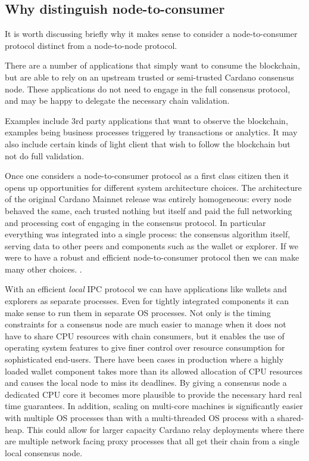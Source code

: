 \documentclass{article}
\newcommand{\njd}[1]{\textcolor{purple}{\emph{#1}}}
\theoremstyle{definition}{
  \newtheorem{lemma}{Lemma}[section] %
  \newtheorem{definition}[lemma]{Definition}
}
\theoremstyle{theorem}{
  \newtheorem{invariant}[lemma]{Invariant}
  \newtheorem{proofobligation}[lemma]{Proof Obligation}
}
\numberwithin{equation}{lemma}
\begin{document}
\subsection{Why distinguish node-to-consumer}

It is worth discussing briefly why it makes sense to consider a node-to-consumer
protocol distinct from a node-to-node protocol.

There are a number of applications that simply want to consume the blockchain,
but are able to rely on an upstream trusted or semi-trusted Cardano consensus
node. These applications do not need to engage in the full consensus protocol,
and may be happy to delegate the necessary chain validation.

Examples include 3rd party applications that want to observe the blockchain,
examples being business processes triggered by transactions or analytics.  It
may also include certain kinds of light client that wish to follow the
blockchain but not do full validation.

Once one considers a node-to-consumer protocol as a first class citizen then it
opens up opportunities for different system architecture choices. The
architecture of the original Cardano Mainnet release was entirely homogeneous:
every node behaved the same, each trusted nothing but itself and paid the full
networking and processing cost of engaging in the consensus protocol.  In
particular everything was integrated into a single process: the consensus
algorithm itself, serving data to other peers and components such as the wallet
or explorer. If we were to have a robust and efficient node-to-consumer protocol
then we can make many other choices. \marginpar{\njd{Process memory space as
    the basis of trust}}.

With an efficient \emph{local} IPC protocol we can have applications like
wallets and explorers as separate processes. Even for tightly integrated
components it can make sense to run them in separate OS processes. Not only is
the timing constraints for a consensus node are much easier to manage when it
does not have to share CPU resources with chain consumers, but it enables the
use of operating system features to give finer control over resource consumption
for sophisticated end-users.
There have been cases in production where a highly
loaded wallet component takes more than its allowed allocation of CPU resources
and causes the local node to miss its deadlines.  By giving a consensus node a
dedicated CPU core it becomes more plausible to provide the necessary hard real
time guarantees. In addition, scaling on multi-core machines is significantly
easier with multiple OS processes than with a multi-threaded OS process with a
shared-heap. This could allow for larger capacity Cardano relay deployments
where there are multiple network facing proxy processes that all get their chain
from a single local consensus node.
\end{document}
